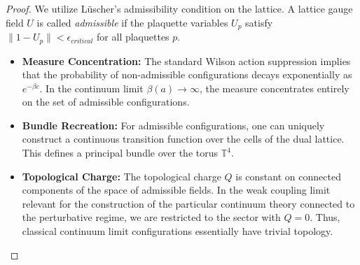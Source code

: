 \begin{proof}
We utilize L\"{u}scher's admissibility condition \cite{luescher1981topology} on the lattice. A lattice gauge field $U$ is called \textit{admissible} if the plaquette variables $U_p$ satisfy $\|1 - U_p\| < \epsilon_{critical}$ for all plaquettes $p$.
\begin{itemize}
    \item \textbf{Measure Concentration:} The standard Wilson action suppression implies that the probability of non-admissible configurations decays exponentially as $e^{-\beta c}$. In the continuum limit $\beta(a) \to \infty$, the measure concentrates entirely on the set of admissible configurations.
    \item \textbf{Bundle Recreation:} For admissible configurations, one can uniquely construct a continuous transition function over the cells of the dual lattice. This defines a principal bundle over the torus $\mathbb{T}^4$. 
    \item \textbf{Topological Charge:} The topological charge $Q$ is constant on connected components of the space of admissible fields. In the weak coupling limit relevant for the construction of the particular continuum theory connected to the perturbative regime, we are restricted to the sector with $Q=0$. Thus, classical continuum limit configurations essentially have trivial topology.
\end{itemize}
\end{proof}


